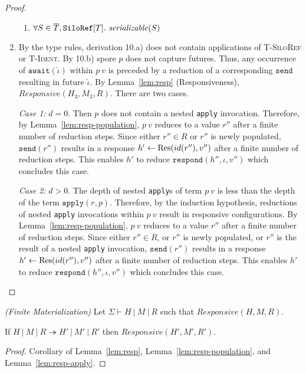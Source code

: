 \begin{proof}
\begin{enumerate}
\begin{enumerate}[label=(\alph*)]
  \item $\forall S \in \overline{T}, \texttt{SiloRef}[T].~\mathit{serializable}(S)$
  \end{enumerate}
  \item By the type rules, derivation 10.a) does not contain
    applications of \textsc{T-SiloRef} or \textsc{T-Ident}. By 10.b)
    spore $p$ does not capture futures. Thus, any occurrence of
    $\texttt{await}(\hat{\iota})$ within $p~v$ is preceded by a
    reduction of a corresponding $\texttt{send}$ resulting in future
    $\hat{\iota}$. By Lemma~\ref{lem:resp} (Responsiveness),
    $\mathit{Responsive}(H_3, M_3, R)$. There are two cases.

    {\em Case 1:} $d = 0$. Then $p$ does not contain a nested
    \texttt{apply} invocation. Therefore, by
    Lemma~\ref{lem:resp-population}, $p~v$ reduces to a value $r''$
    after a finite number of reduction steps. Since either $r'' \in R$
    or $r''$ is newly populated, $\texttt{send}(r'')$ results in a
    response $h' \leftarrow {\textrm{Res}(id(r''), v'')}$ after a finite
    number of reduction steps. This enables $h'$ to reduce
    $\texttt{respond}(h'', \iota, v'')$ which concludes this case.

    {\em Case 2:} $d > 0$. The depth of nested \texttt{apply}s of
    term $p~v$ is less than the depth of the term $\texttt{apply}(r,
    p)$.  Therefore, by the induction hypothesis, reductions of nested
    \texttt{apply} invocations within $p~v$ result in responsive
    configurations. By Lemma~\ref{lem:resp-population}, $p~v$ reduces
    to a value $r''$ after a finite number of reduction steps. Since
    either $r'' \in R$, or $r''$ is newly populated, or $r''$ is the
    result of a nested \texttt{apply} invocation,
    $\texttt{send}(r'')$ results in a response $h' \leftarrow {\textrm{Res}(id(r''), v'')}$ after a finite number of reduction steps. This
    enables $h'$ to reduce $\texttt{respond}(h'', \iota, v'')$ which
    concludes this case.
\end{enumerate}
\end{proof}

\begin{thmun}
\emph{(Finite Materialization)}
  Let $\Sigma \vdash H~|~M~|~R$ such that $\mathit{Responsive}(H, M,
  R)$.

  If $H~|~M~|~R \twoheadrightarrow H'~|~M'~|~R'$ then
  $\mathit{Responsive}(H', M', R')$.
\end{thmun}
\begin{proof}
  Corollary of Lemma~\ref{lem:resp}, Lemma~\ref{lem:resp-population},
  and Lemma~\ref{lem:resp-apply}.
\end{proof}
